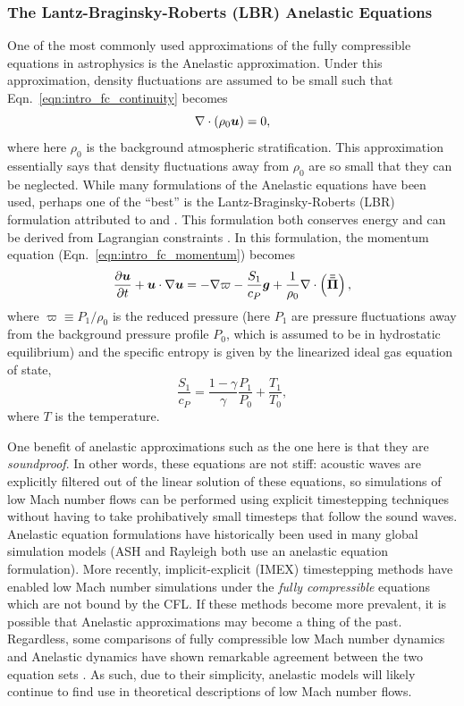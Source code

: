 \subsubsection{The Lantz-Braginsky-Roberts (LBR) Anelastic Equations}
One of the most commonly used approximations of the fully compressible equations in astrophysics is the Anelastic approximation.
Under this approximation, density fluctuations are assumed to be small such that Eqn.~\ref{eqn:intro_fc_continuity} becomes
\begin{equation}
\nabla\cdot\left( \rho_0 \bm{u}\right) = 0,
\label{eqn:intro_an_continuity}
\end{equation}
where here $\rho_0$ is the background atmospheric stratification.
This approximation essentially says that density fluctuations away from $\rho_0$ are so small that they can be neglected.
While many formulations of the Anelastic equations have been used, perhaps one of the ``best'' is the Lantz-Braginsky-Roberts (LBR) formulation attributed to \citet{lantz1992} and \citet{braginsky&roberts1995}.
This formulation both conserves energy \citep{brown&all2012} and can be derived from Lagrangian constraints \citep{vasil&all2013}.
In this formulation, the momentum equation (Eqn.~\ref{eqn:intro_fc_momentum}) becomes
\begin{equation}
\frac{\partial \bm{u}}{\partial t} + \bm{u}\cdot\nabla\bm{u} = -\nabla \varpi - \frac{S_1}{c_P} \bm{g} + \frac{1}{\rho_0}\nabla\cdot\left( \bm{\bar{\bar{\Pi}}}\right),
\label{eqn:intro_an_momentum}
\end{equation}
where $\varpi \equiv P_1 / \rho_0$ is the reduced pressure (here $P_1$ are pressure fluctuations away from the background pressure profile $P_0$, which is assumed to be in hydrostatic equilibrium) and the specific entropy is given by the linearized ideal gas equation of state,
$$
\frac{S_1}{c_P} = \frac{1-\gamma}{\gamma}\frac{P_1}{P_0} + \frac{T_1}{T_0},
$$
where $T$ is the temperature.

One benefit of anelastic approximations such as the one here is that they are \emph{soundproof}.
In other words, these equations are not stiff: acoustic waves are explicitly filtered out of the linear solution of these equations, so simulations of low Mach number flows can be performed using explicit timestepping techniques without having to take prohibatively small timesteps that follow the sound waves.
Anelastic equation formulations have historically been used in many global simulation models (ASH and Rayleigh both use an anelastic equation formulation).
More recently, implicit-explicit (IMEX) timestepping methods have enabled low Mach number simulations under the \emph{fully compressible} equations which are not bound by the CFL.
If these methods become more prevalent, it is possible that Anelastic approximations may become a thing of the past.
Regardless, some comparisons of fully compressible low Mach number dynamics and Anelastic dynamics have shown remarkable agreement between the two equation sets \citep[see e.g.,][and chapter \ref{ch:alb19}]{lecoanet&all2014, andersLB2019}.
As such, due to their simplicity, anelastic models will likely continue to find use in theoretical descriptions of low Mach number flows.

